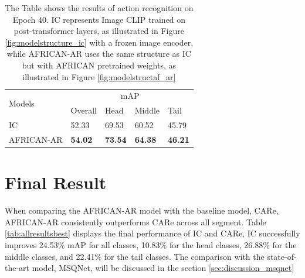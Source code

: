 \begin{table}[ht]
    \centering
    \caption[Results of action recognition (Epoch 40)]{The Table shows the results of action recognition on Epoch 40. IC represents Image CLIP trained on post-transformer layers, as illustrated in Figure \ref{fig:modelstructure_ic} with a frozen image encoder, while AFRICAN-AR uses the same structure as IC but with AFRICAN pretrained weights, as illustrated in Figure \ref{fig:modelstructaf_ar}}
    \label{tab:allresults40}
    \begin{tabular}{lllll}
        \toprule
        \multirow{2}{*}{Models} & \multicolumn{4}{c}{mAP} \\
        \cmidrule{2-5} 
        {} & Overall & Head  & Middle & Tail \\
        \midrule
        IC            & 52.33   & 69.53 & 60.52 & 45.79 \\        
        AFRICAN-AR    & \textbf{54.02} & \textbf{73.54} & \textbf{64.38} & \textbf{46.21} \\
        \bottomrule
    \end{tabular}
\end{table}


\section{Final Result}
When comparing the AFRICAN-AR model with the baseline model, CARe, AFRICAN-AR consistently outperforms CARe across all segment. Table \ref{tab:allresultsbest} displays the final performance of IC and CARe, IC successfully improves 24.53\% mAP for all classes, 10.83\% for the head classes, 26.88\% for the middle classes, and 22.41\% for the tail classes. The comparison with the state-of-the-art model, MSQNet, will be discussed in the section \ref{sec:discussion_msqnet}

